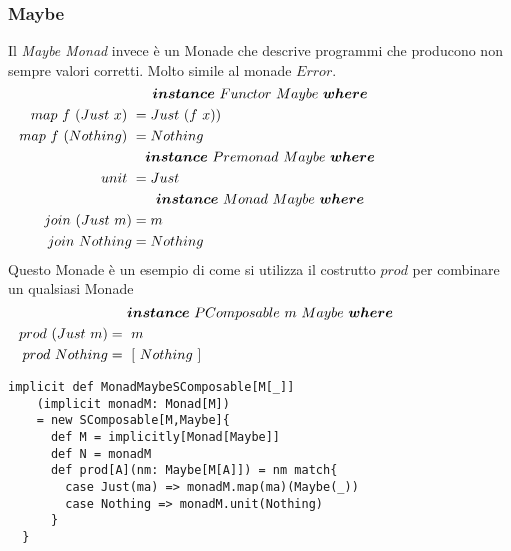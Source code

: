 \pagebreak
\subsubsection*{Maybe}
Il \textit{Maybe Monad} invece è un Monade che descrive programmi che producono
non sempre valori corretti.
Molto simile al monade $Error$.
\begin{align*}
  \classdef{\bm{instance}\ Functor\ Maybe\ \bm{where}}
  map\ f\ (Just\ x)\ &= Just\ (f\ x))\\
  map\ f\ (Nothing)\ &= Nothing\\
  \classdef{\bm{instance}\ Premonad\ Maybe\ \bm{where}}
  unit\ &= Just\\
  \classdef{\bm{instance}\ Monad\ Maybe\ \bm{where}}
  join\ (Just\ m) &= m\\
  join\ Nothing &= Nothing\
\end{align*}
Questo Monade è un esempio di come si utilizza il costrutto $prod$ per combinare
un qualsiasi Monade
\begin{align*}
  \classdef{\bm{instance}\ PComposable\ m\ Maybe\ \bm{where}}
  prod\ (Just\ m) &=\ m\\
  prod\ Nothing &=\ [\ Nothing\ ]\\
\end{align*}

\begin{lstlisting}[style=myScalastyle, caption=Composing Maybe]
  implicit def MonadMaybeSComposable[M[_]]
    (implicit monadM: Monad[M])
    = new SComposable[M,Maybe]{
      def M = implicitly[Monad[Maybe]]
      def N = monadM
      def prod[A](nm: Maybe[M[A]]) = nm match{
        case Just(ma) => monadM.map(ma)(Maybe(_))
        case Nothing => monadM.unit(Nothing)
      }
  }
\end{lstlisting}

\pagebreak